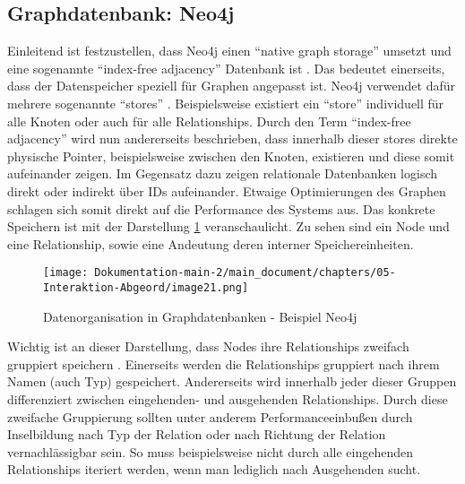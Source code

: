 \subsection{Graphdatenbank: Neo4j}
Einleitend ist festzustellen, dass Neo4j einen \enquote{native graph storage} umsetzt und eine sogenannte \enquote{index-free adjacency} Datenbank ist \cite{robinson2015graph}. Das bedeutet einerseits, dass der Datenspeicher speziell für Graphen angepasst ist. Neo4j verwendet dafür mehrere sogenannte \enquote{stores} \cite{neostores}. Beispielsweise existiert ein \enquote{store} individuell für alle Knoten oder auch für alle Relationships. Durch den Term \enquote{index-free adjacency} wird nun andererseits beschrieben, dass innerhalb dieser stores direkte physische Pointer, beispielsweise zwischen den Knoten, existieren und diese somit aufeinander zeigen. Im Gegensatz dazu zeigen relationale Datenbanken logisch direkt oder indirekt über IDs aufeinander. Etwaige Optimierungen des Graphen schlagen sich somit direkt auf die Performance des Systems aus.
\newline
Das konkrete Speichern ist mit der Darstellung \ref{fig:Dokumentation-main-2/muster_for_teams/chapters/04-Abgeordnete/image21.png} veranschaulicht. Zu sehen sind ein Node und eine Relationship, sowie eine Andeutung deren interner Speichereinheiten.
\begin{figure}[hbt!]
    \centering
    \texttt{[image: Dokumentation-main-2/main\_document/chapters/05-Interaktion-Abgeord/image21.png]}
    \caption{Datenorganisation in Graphdatenbanken - Beispiel Neo4j} \cite{generalStorage}
    \label{fig:Dokumentation-main-2/muster_for_teams/chapters/04-Abgeordnete/image21.png}
\end{figure}
Wichtig ist an dieser Darstellung, dass Nodes ihre Relationships zweifach gruppiert speichern \cite{neo4jrelationshipgrouping}. Einerseits werden die Relationships gruppiert nach ihrem Namen (auch Typ) gespeichert. Andererseits wird innerhalb jeder dieser Gruppen differenziert zwischen eingehenden- und ausgehenden Relationships. Durch diese zweifache Gruppierung sollten unter anderem Performanceeinbußen durch Inselbildung nach Typ der Relation oder nach Richtung der Relation vernachlässigbar sein. So muss beispielsweise nicht durch alle eingehenden Relationships iteriert werden, wenn man lediglich nach Ausgehenden sucht.
